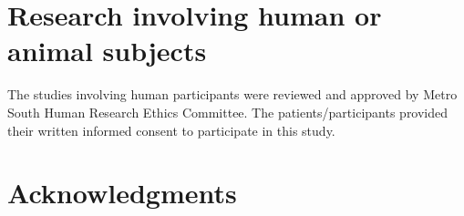 



\pagebreak





\section*{Research involving human or animal subjects}

\begin{instructional}
	The studies involving human participants were reviewed and approved by Metro South Human Research Ethics Committee. The patients/participants provided their written informed consent to participate in this study.
    
    \noindent
\end{instructional}





\clearpage
\section*{Acknowledgments}

\begin{instructional}
    
    \noindent
    
\end{instructional}





\clearpage
